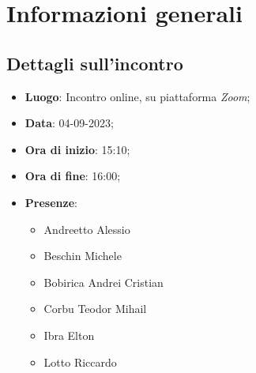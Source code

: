 \section{Informazioni generali}

\subsection{Dettagli sull'incontro}
\begin{itemize}
\item \textbf{Luogo}: Incontro online, su piattaforma \textit{Zoom\glo};
\item \textbf{Data}: 04-09-2023;
\item \textbf{Ora di inizio}: 15:10;
\item \textbf{Ora di fine}: 16:00;
\item \textbf{Presenze}: 
\begin{itemize}
	\item Andreetto Alessio
    \item Beschin Michele
    \item Bobirica Andrei Cristian
    \item Corbu Teodor Mihail
    \item Ibra Elton
    \item Lotto Riccardo 
\end{itemize}
\end{itemize}